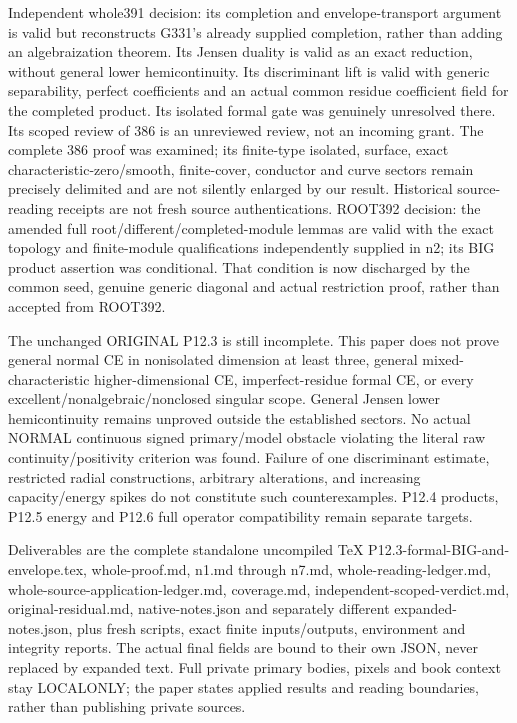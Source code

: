 \documentclass[11pt]{article}
\begin{document}
Independent whole391 decision: its completion and envelope-transport argument is valid but reconstructs G331's already supplied completion, rather than adding an algebraization theorem. Its Jensen duality is valid as an exact reduction, without general lower hemicontinuity. Its discriminant lift is valid with generic separability, perfect coefficients and an actual common residue coefficient field for the completed product. Its isolated formal gate was genuinely unresolved there. Its scoped review of 386 is an unreviewed review, not an incoming grant. The complete 386 proof was examined; its finite-type isolated, surface, exact characteristic-zero/smooth, finite-cover, conductor and curve sectors remain precisely delimited and are not silently enlarged by our result. Historical source-reading receipts are not fresh source authentications. ROOT392 decision: the amended full root/different/completed-module lemmas are valid with the exact topology and finite-module qualifications independently supplied in n2; its BIG product assertion was conditional. That condition is now discharged by the common seed, genuine generic diagonal and actual restriction proof, rather than accepted from ROOT392.

The unchanged ORIGINAL P12.3 is still incomplete. This paper does not prove general normal CE in nonisolated dimension at least three, general mixed-characteristic higher-dimensional CE, imperfect-residue formal CE, or every excellent/nonalgebraic/nonclosed singular scope. General Jensen lower hemicontinuity remains unproved outside the established sectors. No actual NORMAL continuous signed primary/model obstacle violating the literal raw continuity/positivity criterion was found. Failure of one discriminant estimate, restricted radial constructions, arbitrary alterations, and increasing capacity/energy spikes do not constitute such counterexamples. P12.4 products, P12.5 energy and P12.6 full operator compatibility remain separate targets.

Deliverables are the complete standalone uncompiled TeX P12.3-formal-BIG-and-envelope.tex, whole-proof.md, n1.md through n7.md, whole-reading-ledger.md, whole-source-application-ledger.md, coverage.md, independent-scoped-verdict.md, original-residual.md, native-notes.json and separately different expanded-notes.json, plus fresh scripts, exact finite inputs/outputs, environment and integrity reports. The actual final fields are bound to their own JSON, never replaced by expanded text. Full private primary bodies, pixels and book context stay LOCALONLY; the paper states applied results and reading boundaries, rather than publishing private sources.
\end{document}
